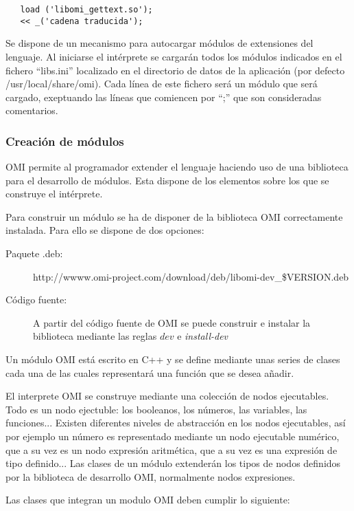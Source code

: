 \begin{lstlisting}  
   load ('libomi_gettext.so');
   << _('cadena traducida');
\end{lstlisting}

Se dispone de un mecanismo para autocargar módulos de extensiones del lenguaje. Al iniciarse 
el intérprete se cargarán todos los módulos indicados en el fichero ``libs.ini'' localizado 
en el directorio de datos de la aplicación (por defecto /usr/local/share/omi). Cada línea 
de este fichero será un módulo que será cargado, exeptuando las líneas que comiencen por ``;'' que
son consideradas comentarios.

\subsubsection{Creación de módulos}
OMI permite al programador extender el lenguaje haciendo uso de una biblioteca para el desarrollo de módulos. Esta
dispone de los elementos sobre los que se construye el intérprete. 

Para construir un módulo se ha de disponer de la biblioteca OMI correctamente instalada. Para ello se
dispone de dos opciones:

\begin{description}
\item[Paquete .deb:] http://wwww.omi-project.com/download/deb/libomi-dev\_\$VERSION.deb
\item[Código fuente:] A partir del código fuente de OMI se puede construir e instalar la biblioteca 
mediante las reglas $dev$ e \emph{install-dev}
\end{description}

Un módulo OMI está escrito en C++ y se define mediante unas series de clases cada una de las cuales representará una
función que se desea añadir. 

El interprete OMI se construye mediante una colección de nodos ejecutables. Todo es un nodo ejectuble: los booleanos,
los números, las variables, las funciones... Existen diferentes niveles de abstracción en los nodos ejecutables, así por ejemplo
un número es representado mediante un nodo ejecutable numérico, que a su vez es un nodo expresión aritmética, que a su vez es
una expresión de tipo definido... Las clases de un módulo extenderán los tipos de nodos definidos por la biblioteca de desarrollo OMI, 
normalmente nodos expresiones.

Las clases que integran un modulo OMI deben cumplir lo siguiente:

